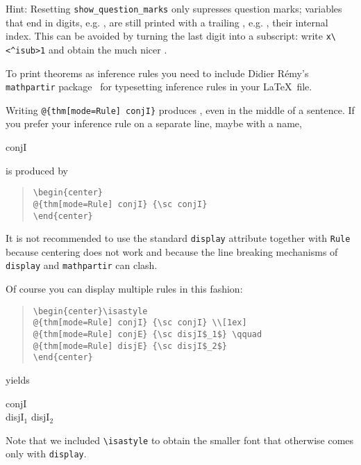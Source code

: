 \begin{isabellebody}
\begin{isamarkuptext}
Hint: Resetting \verb!show_question_marks! only supresses question
marks; variables that end in digits, e.g. , are still
printed with a trailing , e.g. , their
internal index. This can be avoided by turning the last digit into a
subscript: write \verb!x\<^isub>1! and obtain the much nicer .%
\end{isamarkuptext}%
\isamarkuptrue%
\isamarkupfalse%
%
\isamarkuptrue%
%
\begin{isamarkuptext}%
To print theorems as inference rules you need to include Didier
R\'emy's \texttt{mathpartir} package~\cite{mathpartir}
for typesetting inference rules in your \LaTeX\ file.

Writing \verb!@!\verb!{thm[mode=Rule] conjI}! produces
, even in the middle of a sentence.
If you prefer your inference rule on a separate line, maybe with a name,
\begin{center}
 {\sc conjI}
\end{center}
is produced by
\begin{quote}
\verb!\begin{center}!\\
\verb!@!\verb!{thm[mode=Rule] conjI} {\sc conjI}!\\
\verb!\end{center}!
\end{quote}
It is not recommended to use the standard \texttt{display} attribute
together with \texttt{Rule} because centering does not work and because
the line breaking mechanisms of \texttt{display} and \texttt{mathpartir} can
clash.

Of course you can display multiple rules in this fashion:
\begin{quote}
\verb!\begin{center}\isastyle!\\
\verb!@!\verb!{thm[mode=Rule] conjI} {\sc conjI} \\[1ex]!\\
\verb!@!\verb!{thm[mode=Rule] conjE} {\sc disjI$_1$} \qquad!\\
\verb!@!\verb!{thm[mode=Rule] disjE} {\sc disjI$_2$}!\\
\verb!\end{center}!
\end{quote}
yields
\begin{center}\isastyle
{} {\sc conjI} \\[1ex]
 {\sc disjI$_1$} \qquad
{} {\sc disjI$_2$}
\end{center}
Note that we included \verb!\isastyle! to obtain
the smaller font that otherwise comes only with \texttt{display}.


\end{isamarkuptext}
\end{isabellebody}
